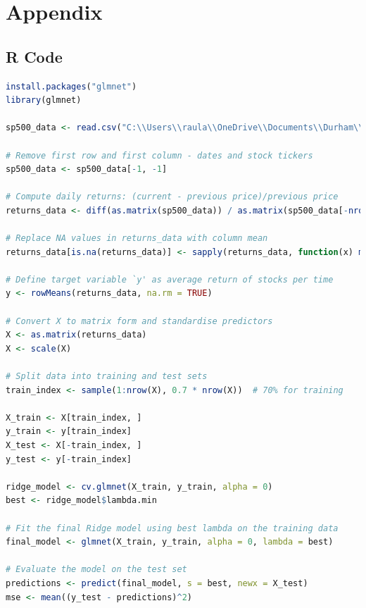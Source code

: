 \documentclass[12pt]{report} %
\begin{document}
\chapter{Appendix}
\section{R Code}
\begin{lstlisting}[language=R, breaklines=true, basicstyle=\ttfamily\small, columns=fullflexible]
install.packages("glmnet")
library(glmnet)

sp500_data <- read.csv("C:\\Users\\raula\\OneDrive\\Documents\\Durham\\4th Year\\High-Dimensional Statistics\\Mini Project Report\\Code\\sp500data.csv")

# Remove first row and first column - dates and stock tickers
sp500_data <- sp500_data[-1, -1]

# Compute daily returns: (current - previous price)/previous price
returns_data <- diff(as.matrix(sp500_data)) / as.matrix(sp500_data[-nrow(sp500_data), ])

# Replace NA values in returns_data with column mean
returns_data[is.na(returns_data)] <- sapply(returns_data, function(x) mean(x, na.rm = TRUE))

# Define target variable `y' as average return of stocks per time
y <- rowMeans(returns_data, na.rm = TRUE)

# Convert X to matrix form and standardise predictors
X <- as.matrix(returns_data)
X <- scale(X)

# Split data into training and test sets
train_index <- sample(1:nrow(X), 0.7 * nrow(X))  # 70% for training

X_train <- X[train_index, ]
y_train <- y[train_index]
X_test <- X[-train_index, ]
y_test <- y[-train_index]

ridge_model <- cv.glmnet(X_train, y_train, alpha = 0)
best <- ridge_model$lambda.min

# Fit the final Ridge model using best lambda on the training data
final_model <- glmnet(X_train, y_train, alpha = 0, lambda = best)

# Evaluate the model on the test set
predictions <- predict(final_model, s = best, newx = X_test)
mse <- mean((y_test - predictions)^2)


\end{lstlisting}
\end{document}
